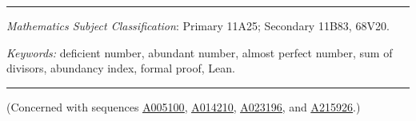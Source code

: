 \documentclass[12pt,reqno]{article}
\newcommand{\seqnum}[1]{\href{https://oeis.org/#1}{\rm \underline{#1}}}
\theoremstyle{plain}
\theoremstyle{definition}
\theoremstyle{remark}
\begin{document}
\bigskip
\hrule
\bigskip

 {\it Mathematics Subject Classification}:
Primary 11A25; Secondary 11B83, 68V20.

\noindent \emph{Keywords:}
deficient number, abundant number, almost perfect number, sum of divisors,
abundancy index, formal proof, Lean.

\bigskip
\hrule
\bigskip

\noindent (Concerned with sequences
\seqnum{A005100},
\seqnum{A014210},
\seqnum{A023196}, and
\seqnum{A215926}.)
\end{document}

